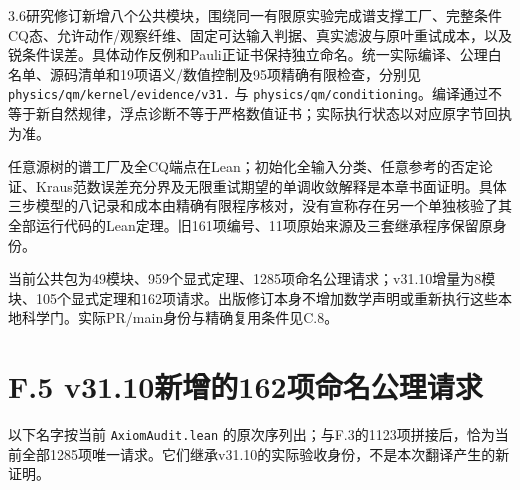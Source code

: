 \documentclass[
  11pt,
  oneside]{book}
\begin{document}
3.6研究修订新增八个公共模块，围绕同一有限原实验完成谱支撑工厂、完整条件CQ态、允许动作/观察纤维、固定可达输入判据、真实滤波与原叶重试成本，以及锐条件误差。具体动作反例和Pauli正证书保持独立命名。统一实际编译、公理白名单、源码清单和19项语义/数值控制及95项精确有限检查，分别见
\texttt{physics/\allowbreak qm/\allowbreak kernel/\allowbreak evidence/\allowbreak v31.} 与
\texttt{physics/\allowbreak qm/\allowbreak conditioning}。编译通过不等于新自然规律，浮点诊断不等于严格数值证书；实际执行状态以对应原字节回执为准。

任意源树的谱工厂及全CQ端点在Lean；初始化全输入分类、任意参考的否定论证、Kraus范数误差充分界及无限重试期望的单调收敛解释是本章书面证明。具体三步模型的八记录和成本由精确有限程序核对，没有宣称存在另一个单独核验了其全部运行代码的Lean定理。旧161项编号、11项原始来源及三套继承程序保留原身份。

当前公共包为49模块、959个显式定理、1285项命名公理请求；v31.10增量为8模块、105个显式定理和162项请求。出版修订本身不增加数学声明或重新执行这些本地科学门。实际PR/main身份与精确复用条件见C.8。

\section{F.5 v31.10新增的162项命名公理请求}

以下名字按当前 \texttt{Axiom\allowbreak Audit.\allowbreak lean}
的原次序列出；与F.3的1123项拼接后，恰为当前全部1285项唯一请求。它们继承v31.10的实际验收身份，不是本次翻译产生的新证明。
\end{document}
